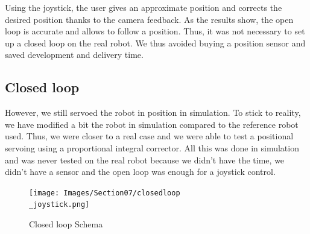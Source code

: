 \bigbreak
Using the joystick, the user gives an approximate position and corrects the desired position thanks to the camera feedback. As the results show, the open loop is accurate and allows to follow a position. Thus, it was not necessary to set up a closed loop on the real robot. We thus avoided buying a position sensor and saved development and delivery time.

\subsection{Closed loop}

However, we still servoed the robot in position in simulation. To stick to reality, we have modified a bit the robot in simulation compared to the reference robot used. Thus, we were closer to a real case and we were able to test a positional servoing using a proportional integral corrector. All this was done in simulation and was never tested on the real robot because we didn't have the time, we didn't have a sensor and the open loop was enough for a joystick control.
\begin{figure}[H]
    \centering
    \texttt{[image: Images/Section07/closedloop\\\_joystick.png]}
    \caption{Closed loop Schema}
    \label{fig:ClosedLoopSchema}
\end{figure}

